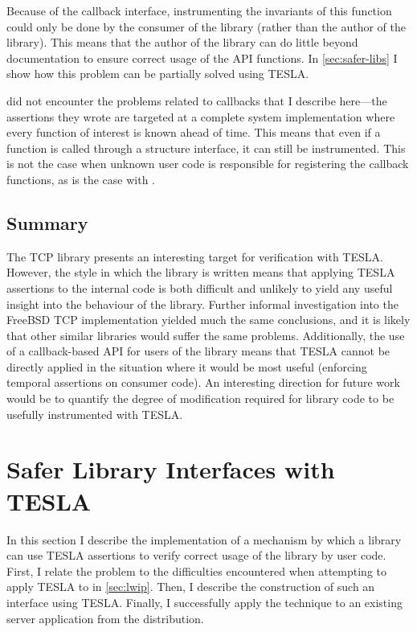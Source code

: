 Because of the callback interface, instrumenting the invariants of this
function could only be done by the consumer of the library (rather than
the author of the library). This means that the author of the library
can do little beyond documentation to ensure correct usage of the API
functions. In \autoref{sec:safer-libs} I show how this problem can be partially
solved using TESLA.

\textcite{anderson_tesla:_2014} did not encounter the problems related to
callbacks that I describe here---the assertions they wrote are targeted at a
complete system implementation where every function of interest is known ahead
of time. This means that even if a function is called through a structure
interface, it can still be instrumented. This is not the case when unknown user
code is responsible for registering the callback functions, as is the case with
\lwip{}.

\subsection{Summary}

The \lwip{} TCP library presents an interesting target for verification with TESLA.
However, the style in which the library is written means that applying TESLA
assertions to the internal code is both difficult and unlikely to yield any
useful insight into the behaviour of the library. Further informal investigation
into the FreeBSD TCP implementation yielded much the same conclusions, and it is
likely that other similar libraries would suffer the same problems.
Additionally, the use of a callback-based API for users of the library means
that TESLA cannot be directly applied in the situation where it would be most
useful (enforcing temporal assertions on consumer code). An interesting
direction for future work would be to quantify the degree of modification
required for library code to be usefully instrumented with TESLA.

\section{Safer Library Interfaces with TESLA} \label{sec:safer-libs}

In this section I describe the implementation of a mechanism by which a library
can use TESLA assertions to verify correct usage of the library by user code.
First, I relate the problem to the difficulties encountered when attempting to
apply TESLA to \lwip{} in \autoref{sec:lwip}. Then, I describe the construction of
such an interface using TESLA. Finally, I successfully apply the technique to an
existing server application from the \lwip{} distribution.


